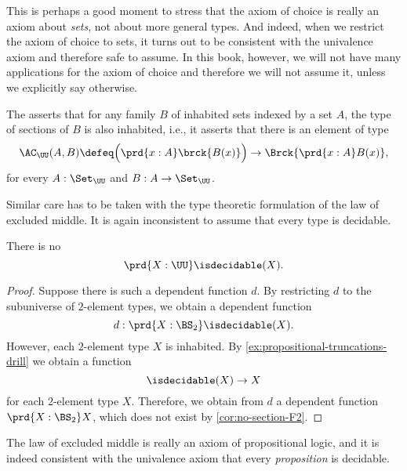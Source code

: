 This is perhaps a good moment to stress that the axiom of choice is really an axiom about \emph{sets}, not about more general types. And indeed, when we restrict the axiom of choice to sets, it turns out to be consistent with the univalence axiom and therefore safe to assume. In this book, however, we will not have many applications for the axiom of choice and therefore we will not assume it, unless we explicitly say otherwise.

\begin{defn}
  The  asserts that for any family $B$ of inhabited sets indexed by a set $A$, the type of sections of $B$ is also inhabited, i.e., it asserts that there is an element of type
  \begin{equation*}
    \AC_{\UU}(A,B)\defeq \Big(\prd{x:A}\brck{B(x)}\Big)\to\Brck{\prd{x:A}B(x)},
  \end{equation*}
  for every $A:\Set_\UU$ and $B:A\to\Set_\UU$.
\end{defn}

Similar care has to be taken with the type theoretic formulation of the law of excluded middle. It is again inconsistent to assume that every type is decidable.

\begin{thm}
  There is no 
  \begin{equation*}
    \prd{X:\UU}\isdecidable(X). 
  \end{equation*}
\end{thm}

\begin{proof}
  Suppose there is such a dependent function $d$. By restricting $d$ to the subuniverse of $2$-element types, we obtain a dependent function
  \begin{equation*}
    d:\prd{X:\BS_2}\isdecidable(X).
  \end{equation*}
  However, each $2$-element type $X$ is inhabited. By \cref{ex:propositional-truncations-drill} we obtain a function
  \begin{equation*}
    \isdecidable(X)\to X
  \end{equation*}
  for each $2$-element type $X$. Therefore, we obtain from $d$ a dependent function $\prd{X:\BS_2}X$, which does not exist by \cref{cor:no-section-F2}.
\end{proof}

The law of excluded middle is really an axiom of propositional logic, and it is indeed consistent with the univalence axiom that every \emph{proposition} is decidable.

